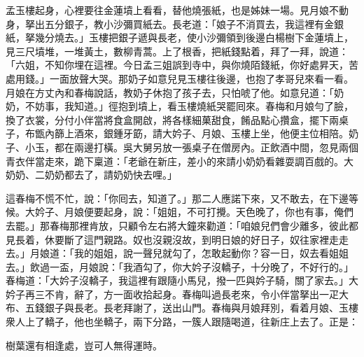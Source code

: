 孟玉樓起身，心裡要往金蓮墳上看看，替他燒張紙，也是姊妹一場。見月娘不動身，{}拏出五分銀子，教小沙彌買紙去。長老道：「娘子不消買去，我這裡有金銀紙，拏幾分燒去。」玉樓把銀子遞與長老，使小沙彌領到後邊白楊樹下金蓮墳上，見三尺墳堆，一堆黃土，數柳青蒿。{}上了根香，把紙錢點着，拜了一拜，說道：「六姐，不知你埋在這裡。今日孟三姐誤到寺中，與你燒陌錢紙，你好處昇天，苦處用錢。」一面放聲大哭。那奶子如意兒見玉樓往後邊，也抱了孝哥兒來看一看。月娘在方丈內和春梅說話，教奶子休抱了孩子去，只怕唬了他。如意兒道：「奶奶，不妨事，我知道。」徑抱到墳上，看玉樓燒紙哭罷囘來。春梅和月娘勻了臉，換了衣裳，分付小伴當將食盒開啟，將各樣細菓甜食，餚品點心攢盒，擺下兩桌子，布甑內篩上酒來，銀鍾牙筯，請大妗子、月娘、玉樓上坐，他便主位相陪。奶子、小玉，都在兩邊打橫。吳大舅另放一張桌子在僧房內。正飲酒中間，忽見兩個青衣伴當走來，跪下稟道：「老爺在新庄，差小的來請小奶奶看雜耍調百戲的。大奶奶、二奶奶都去了，請奶奶快去哩。」

這春梅不慌不忙，{}說：「你囘去，知道了。」那二人應諾下來，又不敢去，在下邊等候。大妗子、月娘便要起身，說：「姐姐，不可打攪。天色晚了，你也有事，俺們去罷。」那春梅那裡肯放，只顧令左右將大鐘來勸道：「咱娘兒們會少離多，彼此都見長着，休要斷了這門親路。奴也沒親沒故，到明日娘的好日子，奴往家裡走走去。」月娘道：「我的姐姐，說一聲兒就勾了，怎敢起動你？容一日，奴去看姐姐去。」{}飲過一盃，月娘說：「我酒勾了，你大妗子沒轎子，十分晚了，不好行的。」春梅道：「大妗子沒轎子，我這裡有跟隨小馬兒，撥一匹與妗子騎，關了家去。」大妗子再三不肯，辭了，方一面收拾起身。春梅叫過長老來，令小伴當拏出一疋大布、五錢銀子與長老。長老拜謝了，送出山門。春梅與月娘拜別，看着月娘、玉樓衆人上了轎子，他也坐轎子，兩下分路，一簇人跟隨喝道，往新庄上去了。正是：

\begin{myquote}
樹葉還有相逢處，豈可人無得運時。
\end{myquote}

